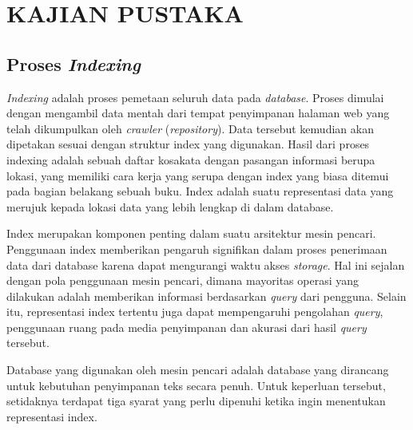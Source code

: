 
\chapter{KAJIAN PUSTAKA}

\section{Proses \emph{Indexing}}

\emph{Indexing} adalah proses pemetaan seluruh data pada \emph{database}.
Proses dimulai dengan mengambil data mentah dari tempat penyimpanan halaman web
yang telah dikumpulkan oleh \emph{crawler} (\textit{repository}). Data tersebut
kemudian akan dipetakan sesuai dengan struktur index yang digunakan. Hasil dari
proses indexing adalah sebuah daftar kosakata dengan pasangan informasi berupa
lokasi, yang memiliki cara kerja yang serupa dengan index yang biasa ditemui
pada bagian belakang sebuah buku. Index adalah suatu representasi data yang
merujuk kepada lokasi data yang lebih lengkap di dalam database.

Index merupakan komponen penting dalam suatu arsitektur mesin pencari.
Penggunaan index memberikan pengaruh signifikan dalam proses penerimaan data
dari database karena dapat mengurangi waktu akses \emph{storage}. Hal ini
sejalan dengan pola penggunaan mesin pencari, dimana mayoritas operasi yang
dilakukan adalah memberikan informasi berdasarkan \emph{query} dari pengguna.
Selain itu, representasi index tertentu juga dapat mempengaruhi pengolahan
\emph{query}, penggunaan ruang pada media penyimpanan dan akurasi dari hasil
\emph{query} tersebut.

Database yang digunakan oleh mesin pencari adalah database yang dirancang
untuk kebutuhan penyimpanan teks secara penuh. Untuk keperluan tersebut,
setidaknya terdapat tiga syarat yang perlu dipenuhi ketika ingin menentukan
representasi index.

